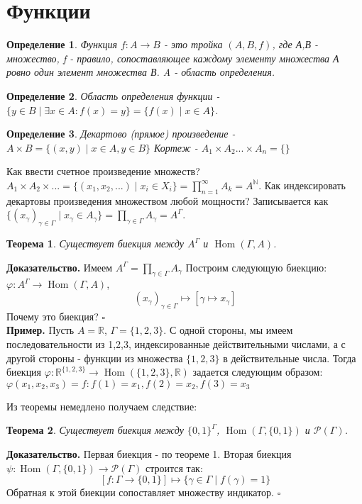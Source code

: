 \documentclass[a4paper]{article}
\newtheorem{defin}{Определение}
\newtheorem{theor}{Теорема}
\DeclareMathOperator{\Hom}{Hom}
\begin{document}
\section{Функции}
\begin{defin}
Функция $f\colon A\to B$ - это тройка  $(A,B,f)$, где А,В - множество,
f - правило, сопоставляющее каждому элементу множества А ровно один элемент
множества В. A - область определения.
\end{defin}
\begin{defin}
Область определения функции - $\{y\in B\mid \exists  x\in A:f(x)=y\} = 
\{f(x)\mid x\in A\}$. 
\end{defin}
\begin{defin}
Декартово (прямое) произведение - 
$A\times B=\{(x,y)\mid x\in A,y\in B\}$ 
Кортеж - $A_1\times A_2...\times A_n = \{\} $
\end{defin}
Как ввести счетное произведение множеств? 
$A_1\times A_2\times ...=\{(x_1,x_2,...)\mid x_i\in X_i\} = 
\prod\limits_{n=1}^{\infty} A_k = A^\mathbb{N}$. 
Как индексировать декартовы произведения множеством любой мощности?
Записывается как $\{(x_\gamma)_{\gamma\in \Gamma}\mid x_\gamma \in 
A_\gamma\} = 
\prod\limits_{\gamma \in \Gamma}^{}A_\gamma = A^\Gamma$.
\begin{theor}
Существует биекция между $A^\Gamma$ и $\Hom(\Gamma,A)$. 
\end{theor}
\textbf{Доказательство.}  Имеем $A^\Gamma = \prod\limits_{\gamma \in \Gamma}
A_\gamma$ 
Построим следующую биекцию: $\varphi\colon A^\Gamma\to\Hom(\Gamma,A)$,
$$(x_\gamma)_{\gamma\in \Gamma}\mapsto[\gamma\mapsto x_\gamma]$$
Почему это биекция?
$\square$ \\
\textbf{Пример.} Пусть $A=\mathbb{R}$, $\Gamma=\{1,2,3\}$. С одной стороны, 
мы имеем последовательности из 1,2,3, индексированные действительными 
числами, а с другой стороны - функции из множества $\{1,2,3\}$ в 
действительные числа. Тогда биекция $\varphi\colon\mathbb{R}^{\{1,2,3\}}\to
\Hom(\{1,2,3\},\mathbb{R})$ задается следующим образом:
$\varphi(x_1,x_2,x_3) = f:f(1)=x_1,f(2)=x_2,f(3)=x_3$

Из теоремы немедлено получаем следствие:
\begin{theor}
Существует биекция между $\{0,1\}^\Gamma$, $\Hom(\Gamma,\{0,1\})$ и 
$\mathcal{P}(\Gamma)$.
\end{theor}
\textbf{Доказательство.} Первая биекция - по теореме 1. Вторая биекция\\
$\psi\colon\Hom(\Gamma,\{0,1\})\to\mathcal{P}(\Gamma)$ строится так:
$$[f\colon\Gamma\to \{0,1\}]\mapsto \{\gamma\in\Gamma\mid f(\gamma)=1\}$$ 
Обратная к этой биекции сопоставляет множеству индикатор. $\square$ \\
\end{document}
